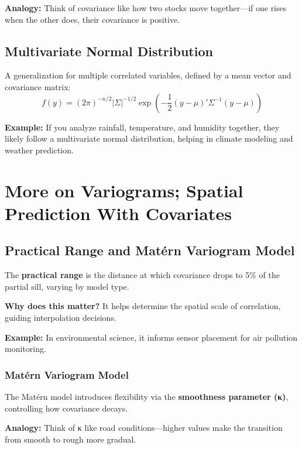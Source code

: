 \documentclass[
  11pt,
]{report}
\begin{document}
\textbf{Analogy:} Think of covariance like how two stocks move
together---if one rises when the other does, their covariance is
positive.

\section{Multivariate Normal
Distribution}\label{multivariate-normal-distribution}

A generalization for multiple correlated variables, defined by a mean
vector and covariance matrix: \[
f(y) = (2\pi)^{-n/2} |\Sigma|^{-1/2} \exp \left( -\frac{1}{2} (y - \mu)' \Sigma^{-1} (y - \mu) \right)
\]

\textbf{Example:} If you analyze rainfall, temperature, and humidity
together, they likely follow a multivariate normal distribution, helping
in climate modeling and weather prediction.

\chapter{More on Variograms; Spatial Prediction With
Covariates}\label{more-on-variograms-spatial-prediction-with-covariates}

\section{Practical Range and Matérn Variogram
Model}\label{practical-range-and-matuxe9rn-variogram-model}

The \textbf{practical range} is the distance at which covariance drops
to 5\% of the partial sill, varying by model type.

\textbf{Why does this matter?} It helps determine the spatial scale of
correlation, guiding interpolation decisions.

\textbf{Example:} In environmental science, it informs sensor placement
for air pollution monitoring.

\subsection{Matérn Variogram Model}\label{matuxe9rn-variogram-model}

The Matérn model introduces flexibility via the \textbf{smoothness
parameter (κ)}, controlling how covariance decays.

\textbf{Analogy:} Think of κ like road conditions---higher values make
the transition from smooth to rough more gradual.
\end{document}
